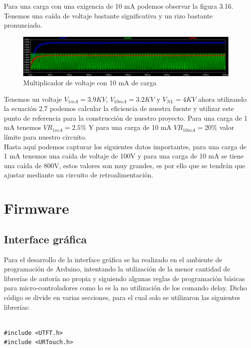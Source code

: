 Para una carga con una exigencia de 10 mA podemos observar la figura 3.16. Tenemos una caída de voltaje bastante significativa y un rizo bastante pronunciado.


\begin{figure}[H]
\centering
\includegraphics[width=12cm]{Capitulo3/figs/10ma.png}
\caption{Multiplicador de voltaje con 10 mA de carga}
\end{figure}

Tenemos un voltaje $V_{1mA}=3.9KV$, $V_{10mA}=3.2KV$ y $V_{NL}=4KV$ ahora utilizando la ecuación 2.7 podemos calcular la eficiencia de nuestra fuente y utilizar este punto de referencia para la construcción de nuestro proyecto. Para una carga de 1 mA tenemos $VR_{1mA}=2.5\%$ Y para una carga de 10 mA $VR_{10mA}=20\%$ valor límite para nuestro circuito.\\

Hasta aquí podemos capturar los siguientes datos importantes, para una carga de 1 mA tenemos una caída de voltaje de 100V y para una carga de 10 mA se tiene una caída de 800V, estos valores son muy grandes, es por ello que se tendrán que ajustar mediante un circuito de retroalimentación. 
\newpage

\section{Firmware}
\subsection{Interface gráfica}
Para el desarrollo de la interface gráfica se ha realizado en el ambiente de programación de Arduino, intentando la utilización de la menor cantidad de librerías de autoría no propia y siguiendo algunas reglas de programación básicas para micro-controladores como lo es la no utilización de los comando delay. Dicho código se divide en varias secciones, para el cual solo se utilizaron las siguientes librerías:

\begin{verbatim}

#include <UTFT.h>
#include <URTouch.h>

\end{verbatim}

